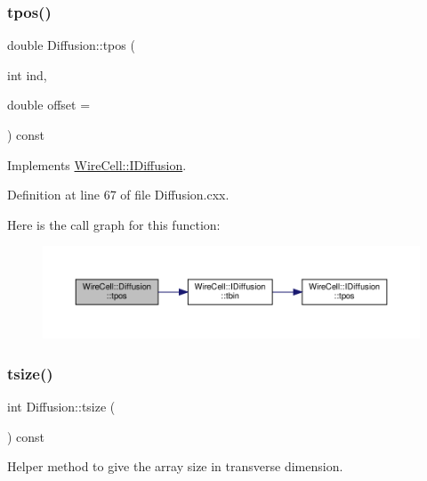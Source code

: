 \subsubsection{\texorpdfstring{tpos()}{tpos()}}
{\footnotesize\ttfamily double Diffusion\+::tpos (\begin{DoxyParamCaption}\item[{int}]{ind,  }\item[{double}]{offset = {} }\end{DoxyParamCaption}) const\hspace{0.3cm}{\ttfamily [virtual]}}



Implements \hyperlink{class_wire_cell_1_1_i_diffusion_a0f9fd1a277828333fa08f77fd9a6315d}{Wire\+Cell\+::\+I\+Diffusion}.



Definition at line 67 of file Diffusion.\+cxx.

Here is the call graph for this function\+:
\nopagebreak
\begin{figure}[H]
\begin{center}
\leavevmode
\includegraphics[width=350pt]{class_wire_cell_1_1_diffusion_a86e78fa0c302bbbd2e1329b3f0294454_cgraph}
\end{center}
\end{figure}
\mbox{\label{class_wire_cell_1_1_diffusion_a0833d46be2aba6c268fef7dbd7fc2245}} 
\subsubsection{\texorpdfstring{tsize()}{tsize()}}
{\footnotesize\ttfamily int Diffusion\+::tsize (\begin{DoxyParamCaption}{ }\end{DoxyParamCaption}) const\hspace{0.3cm}{\ttfamily [virtual]}}



Helper method to give the array size in transverse dimension. 



